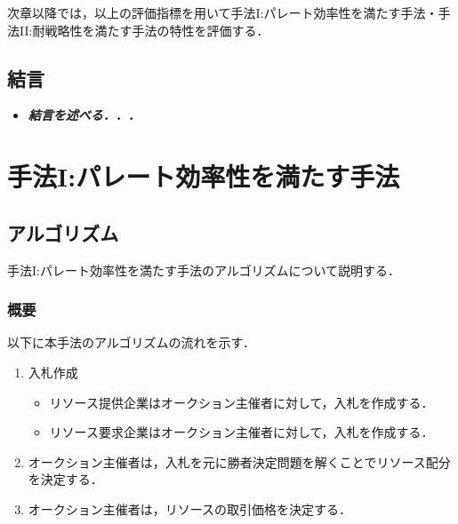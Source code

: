 次章以降では，以上の評価指標を用いて手法I:パレート効率性を満たす手法・手法II:耐戦略性を満たす手法の特性を評価する．

\hypertarget{ux7d50ux8a00}{%
\section{結言}\label{ux7d50ux8a00}}

\begin{itemize}
\tightlist
\item
  \textbf{\emph{結言を述べる．．．}}
\end{itemize}

\hypertarget{ux624bux6cd5iux30d1ux30ecux30fcux30c8ux52b9ux7387ux6027ux3092ux6e80ux305fux3059ux624bux6cd5}{%
\chapter{手法I:パレート効率性を満たす手法}\label{ux624bux6cd5iux30d1ux30ecux30fcux30c8ux52b9ux7387ux6027ux3092ux6e80ux305fux3059ux624bux6cd5}}

\hypertarget{ux30a2ux30ebux30b4ux30eaux30baux30e0}{%
\section{アルゴリズム}\label{ux30a2ux30ebux30b4ux30eaux30baux30e0}}

手法I:パレート効率性を満たす手法のアルゴリズムについて説明する．

\hypertarget{ux6982ux8981}{%
\subsection{概要}\label{ux6982ux8981}}

以下に本手法のアルゴリズムの流れを示す．

\begin{enumerate}
\def\labelenumi{\arabic{enumi}.}
\tightlist
\item
  入札作成

  \begin{itemize}
  \item
    リソース提供企業はオークション主催者に対して，入札を作成する．
  \item
    リソース要求企業はオークション主催者に対して，入札を作成する．
  \end{itemize}
\item
  オークション主催者は，入札を元に勝者決定問題を解くことでリソース配分を決定する．
\item
  オークション主催者は，リソースの取引価格を決定する．
\end{enumerate}

